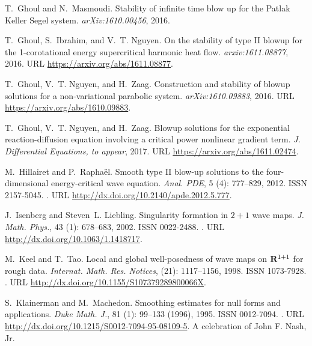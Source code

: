 \documentclass[11pt]{aims}
\theoremstyle{definition}
\numberwithin{equation}{section}
\begin{document}
\begin{thebibliography}{62}
T.~Ghoul and N.~Masmoudi.
\newblock Stability of infinite time blow up for the {P}atlak {K}eller {S}egel
  system.
\newblock \emph{arXiv:1610.00456}, 2016.

T.~Ghoul, S.~Ibrahim, and V.~T. Nguyen.
\newblock On the stability of type {II} blowup for the 1-corotational energy
  supercritical harmonic heat flow.
\newblock \emph{arxiv:1611.08877}, 2016{}.
\newblock URL \url{https://arxiv.org/abs/1611.08877}.

T.~Ghoul, V.~T. Nguyen, and H.~Zaag.
\newblock Construction and stability of blowup solutions for a non-variational
  parabolic system.
\newblock \emph{arXiv:1610.09883}, 2016{}.
\newblock URL \url{https://arxiv.org/abs/1610.09883}.

T.~Ghoul, V.~T. Nguyen, and H.~Zaag.
\newblock Blowup solutions for the exponential reaction-diffusion equation
  involving a critical power nonlinear gradient term.
\newblock \emph{J. Differential Equations, to appear}, 2017.
\newblock URL \url{https://arxiv.org/abs/1611.02474}.

M.~Hillairet and P.~Rapha{\"e}l.
\newblock Smooth type {II} blow-up solutions to the four-dimensional
  energy-critical wave equation.
\newblock \emph{Anal. PDE}, 5 (4): 777--829, 2012.
\newblock ISSN 2157-5045.
\newblock {}.
\newblock URL \url{http://dx.doi.org/10.2140/apde.2012.5.777}.

J.~Isenberg and Steven~L. Liebling.
\newblock Singularity formation in {$2+1$} wave maps.
\newblock \emph{J. Math. Phys.}, 43 (1): 678--683, 2002.
\newblock ISSN 0022-2488.
\newblock {}.
\newblock URL \url{http://dx.doi.org/10.1063/1.1418717}.

M.~Keel and T.~Tao.
\newblock Local and global well-posedness of wave maps on {$\bold R^{1+1}$} for
  rough data.
\newblock \emph{Internat. Math. Res. Notices},  (21):
  1117--1156, 1998.
\newblock ISSN 1073-7928.
\newblock {}.
\newblock URL \url{http://dx.doi.org/10.1155/S107379289800066X}.

S.~Klainerman and M.~Machedon.
\newblock Smoothing estimates for null forms and applications.
\newblock \emph{Duke Math. J.}, 81 (1): 99--133 (1996), 1995.
\newblock ISSN 0012-7094.
\newblock {}.
\newblock URL \url{http://dx.doi.org/10.1215/S0012-7094-95-08109-5}.
\newblock A celebration of John F. Nash, Jr.


\end{thebibliography}
\end{document}
